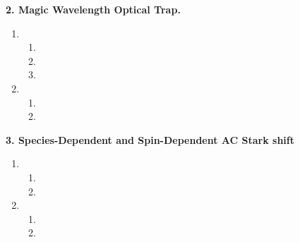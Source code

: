 \documentclass{article}
\theoremstyle{definition}
\begin{document}
\noindent \textbf{2. Magic Wavelength Optical Trap.}

\begin{enumerate}[label=(\alph*)]
	\item 
	
	\begin{enumerate}[label=(\roman*)]
		\item 
		
		\item 
		
		\item 
	\end{enumerate}
	
	\item 
	
	\begin{enumerate}[label=(\roman*)]
		\item 
		
		\item 
		
		
	\end{enumerate}
\end{enumerate}


\noindent \textbf{3. Species-Dependent and Spin-Dependent AC Stark shift}	
	
\begin{enumerate}[label=(\alph*)]
	\item 
	
	\begin{enumerate}[label=(\roman*)]
		\item 
		
		\item 
		

	\end{enumerate}
	
	\item 
	
	\begin{enumerate}[label=(\roman*)]
		\item 
		
		\item 
		
		
	\end{enumerate}
\end{enumerate}
	
	
\end{document}
